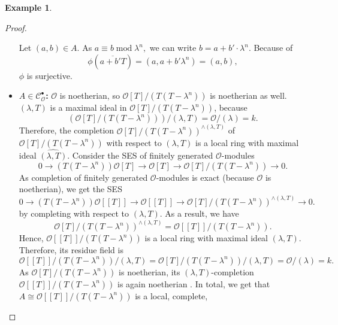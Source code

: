 \documentclass{article}
\theoremstyle{plain}%
\theoremstyle{definition}
\newtheorem{example}{Example}[section]
\theoremstyle{remark}
\newcommand{\cob}{\mathcal{C}_\mathcal{O}^\bullet}
\begin{document}
\begin{example}
\begin{proof}
\begin{itemize}
                Let \((a,b) \in A\).
                As \(a \equiv b \operatorname{mod} \lambda^n,\) we can write \(b = a + b' \cdot \lambda^n\). 
                Because of
                \[\phi(\overline{a + b'T}) = (a, a + b' \lambda^n) = (a,b),\] 
                \(\phi\) is surjective.
            \item \textbf{\(A\in \cob\):}
                \(\mathcal{O}\) is noetherian, so \(\mathcal{O}[T]/(T(T-\lambda^n))\) is noetherian as well.
                \((\lambda, T)\) is a maximal ideal in \(\mathcal{O}[T]/(T(T-\lambda^n))\), because
                \[\left(\mathcal{O}[T]/(T(T-\lambda^n))\right)/(\lambda, T) = \mathcal{O}/(\lambda) = k.\]
                Therefore, the completion \(\mathcal{O}[T]/(T(T-\lambda^n))^{\wedge(\lambda, T)}\) 
                of \(\mathcal{O}[T]/(T(T-\lambda^n))\) with respect to \((\lambda, T)\) is a local ring 
                with maximal ideal \(\widehat{(\lambda, T)}\).
                Consider the SES of finitely generated \(\mathcal{O}\)-modules
                \[
                    0 \to (T(T - \lambda^n)) \mathcal{O}[T] \to \mathcal{O}[T] 
                    \to \mathcal{O}[T]/(T(T-\lambda^n)) \to 0.
                \]
                As completion of finitely generated \(\mathcal{O}\)-modules is exact 
                (because \(\mathcal{O}\) is noetherian), we get the SES
                \[
                    0 \to (T(T-\lambda^n))\mathcal{O}[[T]] \to \mathcal{O}[[T]] 
                    \to \mathcal{O}[T]/(T(T-\lambda^n))^{\wedge (\lambda, T)}  \to 0.
                \]
                by completing with respect to \((\lambda, T)\).
                As a result, we have
                \[
                    \mathcal{O}[T]/(T(T-\lambda^n))^{\wedge (\lambda, T)} = \mathcal{O}[[T]]/(T(T-\lambda^n)).
                \]
                Hence, \(\mathcal{O}[[T]]/(T(T-\lambda^n))\) is a local ring with maximal ideal \((\lambda, T)\).
                Therefore, its residue field is
                \[
                    \mathcal{O}[[T]]/(T(T-\lambda^n))/(\lambda, T) = \mathcal{O}[T]/(T(T-\lambda^n))/(\lambda, T) 
                    = \mathcal{O}/(\lambda) = k.
                \]
                As \(\mathcal{O}[T]/(T(T-\lambda^n))\) is noetherian, its \((\lambda, T)\)-completion 
                \(\mathcal{O}[[T]]/(T(T-\lambda^n))\) is again noetherian \cite[cf.][theorem 10.26]{Atiyah1969}.
                In total, we get that \(A \cong \mathcal{O}[[T]]/(T(T-\lambda^n))\) is a local, complete, 

\end{itemize}
\end{proof}
\end{example}
\end{document}
